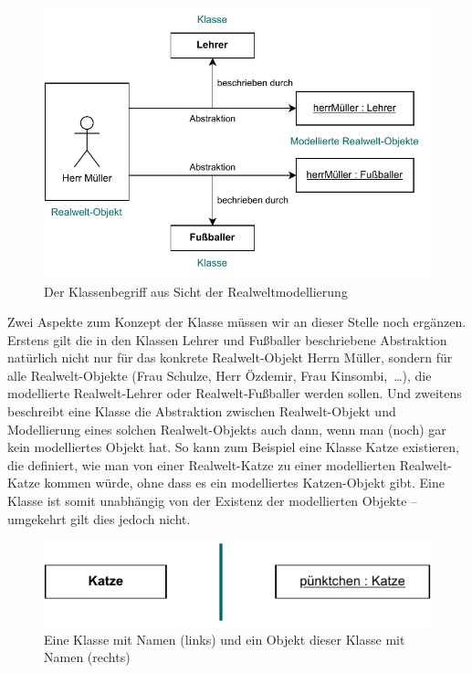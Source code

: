 \begin{figure}[h!]
	\centering
	\includegraphics{Bilder/Kapitel-4/klassenbegriff_realweltmodellierung.pdf}
	\caption{Der Klassenbegriff aus Sicht der Realweltmodellierung}
	\label{fig:klassenbegriff}
\end{figure}


Zwei Aspekte zum Konzept der Klasse müssen wir an dieser Stelle noch ergänzen. Erstens gilt die in den Klassen Lehrer und Fußballer beschriebene Abstraktion natürlich nicht nur für das konkrete Realwelt-Objekt Herrn Müller, sondern für alle Realwelt-Objekte (Frau Schulze, Herr Özdemir, Frau Kinsombi,~\ldots), die modellierte Realwelt-Lehrer oder Realwelt-Fußballer werden sollen. Und zweitens beschreibt eine Klasse die Abstraktion zwischen Realwelt-Objekt und Modellierung eines solchen Realwelt-Objekts auch dann, wenn man (noch) gar kein modelliertes Objekt hat. So kann zum Beispiel eine Klasse Katze existieren, die definiert, wie man von einer Realwelt-Katze zu einer modellierten Realwelt-Katze kommen würde, ohne dass es ein modelliertes Katzen-Objekt gibt. Eine Klasse ist somit unabhängig von der Existenz der modellierten Objekte – umgekehrt gilt dies jedoch nicht.

\vspace{\baselineskip} %

\begin{figure}[h!]
	\centering
	\includegraphics{Bilder/Kapitel-4/darstellung_klasse.pdf}
	\caption[Eine Klasse mit Namen  und ein Objekt dieser Klasse]{Eine Klasse mit Namen  (links) und ein Objekt dieser Klasse mit Namen  (rechts)}
	\label{fig:darstellung_klasse}
\end{figure}

